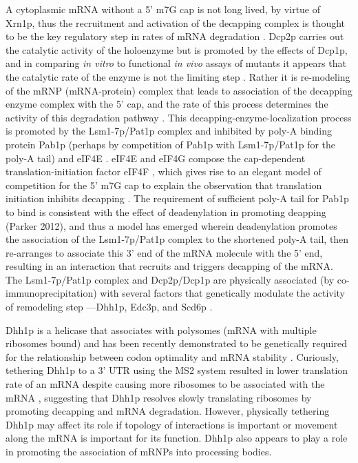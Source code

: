 A
cytoplasmic mRNA without a 5' m7G cap is not long lived, by virtue of
Xrn1p, thus the recruitment and activation of the decapping complex is
thought to be the key regulatory step in rates of mRNA degradation
\parencite{coller2004eukaryotic}.
Dcp2p carries out the catalytic activity of
the holoenzyme but is promoted by the effects of Dcp1p, and in
comparing \textit{in vitro} to functional \textit{in vivo} assays 
of mutants it appears
that the catalytic rate of the enzyme is not the limiting step 
\parencite{tharun1999analysis}. 
Rather it is re-modeling of the mRNP (mRNA-protein) complex that
leads to association of the decapping enzyme complex with the 5' cap,
and the rate of this process determines the activity of this
degradation pathway 
\parencite{tharun2001targeting}.
This
decapping-enzyme-localization process is promoted by the Lsm1-7p/Pat1p
complex and inhibited by poly-A binding protein Pab1p (perhaps by
competition of Pab1p with Lsm1-7p/Pat1p for the poly-A tail) and eIF4E
\parencite{coller2004eukaryotic,caponigro1996mechanisms}. 
eIF4E and eIF4G
compose the cap-dependent translation-initiation factor eIF4F
\parencite{dever2016mechanism}, 
which gives rise to an elegant model of competition for the 5' m7G cap
to explain the observation that
translation initiation inhibits decapping
\parencite{huch2014interrelations}.
The requirement of sufficient
poly-A tail for Pab1p to bind is consistent with the effect of
deadenylation in promoting deapping (Parker 2012), and thus a model
has emerged wherein deadenylation promotes the association of the 
Lsm1-7p/Pat1p complex to the shortened poly-A tail, then re-arranges
to associate this 3' end of the mRNA molecule with the 5' end,
resulting in an interaction that recruits and triggers decapping
of the mRNA. 
The Lsm1-7p/Pat1p
complex and Dcp2p/Dcp1p are physically associated (by
co-immunoprecipitation) with several factors that genetically modulate
the activity of remodeling step ---Dhh1p, Edc3p, and Scd6p 
\parencite{nissan2010decapping}.

Dhh1p is a helicase that associates with polysomes (mRNA
with multiple ribosomes bound) and has been recently demonstrated to
be genetically required for the relationship between codon optimality
and mRNA stability 
\parencite{sweet2012dead,radhakrishnan2016dead,presnyak2015codon}. 
Curiously, tethering Dhh1p to a 3' UTR
using the MS2 system resulted in lower translation rate of an mRNA
despite causing more ribosomes to be associated with the mRNA
\parencite{sweet2012dead}, suggesting that Dhh1p resolves slowly 
translating ribosomes by promoting decapping and mRNA degradation.  
However, physically tethering Dhh1p may affect its role if
topology of interactions is important or movement along the mRNA
is important for its function.
Dhh1p also appears to play a role in promoting the association of
mRNPs into processing bodies.

